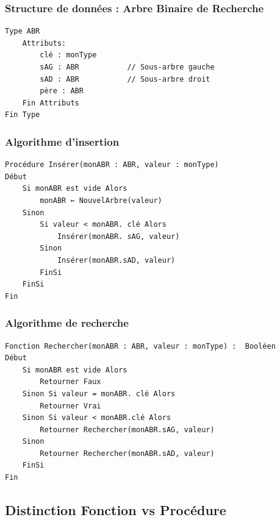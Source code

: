 \documentclass[12pt,a4paper]{article}
\begin{document}
\subsubsection{Structure de données :  Arbre Binaire de Recherche}

\begin{exemple}
\begin{verbatim}
Type ABR
    Attributs: 
        clé : monType
        sAG : ABR           // Sous-arbre gauche
        sAD : ABR           // Sous-arbre droit
        père : ABR
    Fin Attributs
Fin Type
\end{verbatim}
\end{exemple}

\subsubsection{Algorithme d'insertion}

\begin{exemple}
\begin{verbatim}
Procédure Insérer(monABR : ABR, valeur : monType)
Début
    Si monABR est vide Alors
        monABR ← NouvelArbre(valeur)
    Sinon
        Si valeur < monABR. clé Alors
            Insérer(monABR. sAG, valeur)
        Sinon
            Insérer(monABR.sAD, valeur)
        FinSi
    FinSi
Fin
\end{verbatim}
\end{exemple}

\subsubsection{Algorithme de recherche}

\begin{exemple}
\begin{verbatim}
Fonction Rechercher(monABR : ABR, valeur : monType) :  Booléen
Début
    Si monABR est vide Alors
        Retourner Faux
    Sinon Si valeur = monABR. clé Alors
        Retourner Vrai
    Sinon Si valeur < monABR.clé Alors
        Retourner Rechercher(monABR.sAG, valeur)
    Sinon
        Retourner Rechercher(monABR.sAD, valeur)
    FinSi
Fin
\end{verbatim}
\end{exemple}

\newpage
{}
\subsection{Distinction Fonction vs Procédure}
\end{document}
